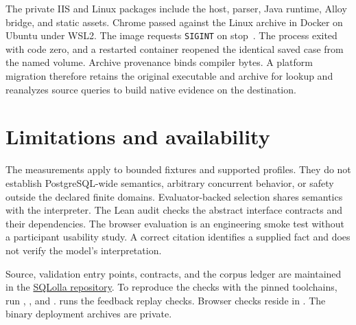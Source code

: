 \documentclass[sigconf,nonacm]{acmart}
\begin{document}
The private IIS and Linux packages include the host, parser, Java runtime, Alloy bridge, and static assets. Chrome passed against the Linux archive in Docker on Ubuntu under WSL2. The image requests \texttt{SIGINT} on stop~\cite{dockerstop}. The process exited with code zero, and a restarted container reopened the identical saved case from the named volume. Archive provenance binds compiler bytes. A platform migration therefore retains the original executable and archive for lookup and reanalyzes source queries to build native evidence on the destination.

\section{Limitations and availability}
The measurements apply to bounded fixtures and supported profiles. They do not establish PostgreSQL-wide semantics, arbitrary concurrent behavior, or safety outside the declared finite domains. Evaluator-backed selection shares semantics with the interpreter. The Lean audit checks the abstract interface contracts and their dependencies. The browser evaluation is an engineering smoke test without a participant usability study. A correct citation identifies a supplied fact and does not verify the model's interpretation.

Source, validation entry points, contracts, and the corpus ledger are maintained in the \href{https://github.com/University-of-Wild-Chicken/SQLolla}{SQLolla repository}. To reproduce the checks with the pinned toolchains, run , , and .  runs the feedback replay checks. Browser checks reside in . The binary deployment archives are private.

\FloatBarrier
\balance


\end{document}

